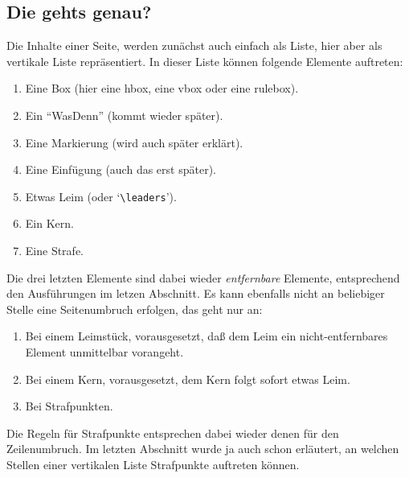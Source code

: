 \subsection{Die gehts genau?}
Die Inhalte einer Seite, werden zun\"achst auch einfach als Liste, hier
aber als vertikale Liste repr\"asentiert. In dieser Liste k\"onnen
folgende Elemente auftreten:
\begin{enumerate}
\item Eine Box (hier eine hbox, eine vbox oder eine rulebox).
\item Ein ``WasDenn'' (kommt wieder sp\"ater).
\item Eine Markierung (wird auch sp\"ater erkl\"art).
\item Eine Einf\"ugung (auch das erst sp\"ater).
\item Etwas Leim (oder `\verb|\leaders|').
\item Ein Kern.
\item Eine Strafe.
\end{enumerate}
Die drei letzten Elemente sind dabei wieder {\em entfernbare}
Elemente, entsprechend den Ausf\"uhrungen im letzen Abschnitt. Es kann
ebenfalls nicht an beliebiger Stelle eine Seitenumbruch erfolgen, das
geht nur an:
\begin{enumerate}
\item Bei einem Leimst\"uck, vorausgesetzt, da\ss{} dem Leim ein
nicht-entfernbares Element unmittelbar vorangeht.
\item Bei einem Kern, vorausgesetzt, dem Kern folgt sofort etwas Leim.
\item Bei Strafpunkten.
\end{enumerate}
Die Regeln f\"ur Strafpunkte entsprechen dabei wieder denen f\"ur den
Zeilenumbruch. Im letzten Abschnitt wurde ja auch schon erl\"autert, an
welchen Stellen einer vertikalen Liste Strafpunkte auftreten k\"onnen.

